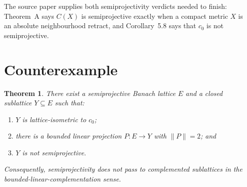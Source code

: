 \documentclass[11pt]{article}
\newtheorem{theorem}{Theorem}
\begin{document}
The source paper supplies both semiprojectivity verdicts needed to finish:
Theorem~A says $C(X)$ is semiprojective exactly when a compact metric $X$ is
an absolute neighbourhood retract, and Corollary~5.8 says that $c_0$ is not
semiprojective.

\section{Counterexample}

\begin{theorem}
There exist a semiprojective Banach lattice $E$ and a closed sublattice
$Y\subseteq E$ such that:
\begin{enumerate}
\item $Y$ is lattice-isometric to $c_0$;
\item there is a bounded linear projection $P:E\to Y$ with $\|P\|=2$; and
\item $Y$ is not semiprojective.
\end{enumerate}
Consequently, semiprojectivity does not pass to complemented sublattices in
the bounded-linear-complementation sense.
\end{theorem}
\end{document}
